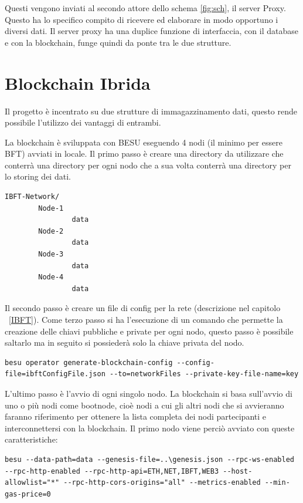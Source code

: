 \documentclass[11pt,a4paper,titlepage]{report}
\begin{document}
Questi vengono inviati al secondo attore dello schema \ref{fig:sch}, il server Proxy. Questo ha lo specifico compito di ricevere ed elaborare in modo opportuno i diversi dati. Il server proxy ha una duplice funzione di interfaccia, con il database e con la blockchain, funge quindi da ponte tra le due strutture.

\section{Blockchain Ibrida}
Il progetto è incentrato su due strutture di immagazzinamento dati, questo rende possibile l'utilizzo dei vantaggi di entrambi.

La blockchain è sviluppata con BESU eseguendo 4 nodi (il minimo per essere BFT) avviati in locale.
Il primo passo è creare una directory da utilizzare che conterrà una directory per ogni nodo che a sua volta conterrà una directory per lo storing dei dati.
\begin{lstlisting}[language=command.com]
IBFT-Network/
		Node-1
				data
		Node-2
				data
		Node-3
				data
		Node-4
				data
\end{lstlisting}

Il secondo passo è creare un file di config per la rete (descrizione nel capitolo ~\ref{IBFT}).
Come terzo passo si ha l'esecuzione di un comando che permette la creazione delle chiavi pubbliche e private per ogni nodo, questo passo è possibile saltarlo ma in seguito si possiederà solo la chiave privata del nodo.
\begin{lstlisting}[language=command.com]
besu operator generate-blockchain-config --config-file=ibftConfigFile.json --to=networkFiles --private-key-file-name=key
\end{lstlisting}

L'ultimo passo è l'avvio di ogni singolo nodo. La blockchain si basa sull'avvio di uno o più nodi come bootnode, cioè nodi a cui gli altri nodi che si avvieranno faranno riferimento per ottenere la lista completa dei nodi partecipanti e interconnettersi con la blockchain.
Il primo nodo viene perciò avviato con queste caratteristiche:
\begin{lstlisting}[language=command.com]
besu --data-path=data --genesis-file=..\genesis.json --rpc-ws-enabled --rpc-http-enabled --rpc-http-api=ETH,NET,IBFT,WEB3 --host-allowlist="*" --rpc-http-cors-origins="all" --metrics-enabled --min-gas-price=0
\end{lstlisting}
\end{document}
